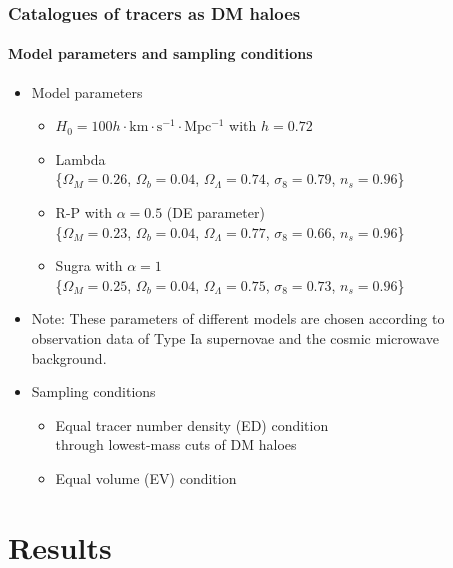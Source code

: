 \documentclass{beamer}
\newtheorem{Narrow down the analysis}{Narrow down the analysis}
\begin{document}
\begin{frame}
	\frametitle{Catalogues of tracers as DM haloes}
	\framesubtitle{Model parameters and sampling conditions}
	\begin{itemize}
	\pause \item Model parameters
		\begin{itemize}
		\pause \item $H_{0}=100h\cdot\mathrm{km\cdot s^{-1}\cdot Mpc^{-1}}$ with $h=0.72$
		\pause \item Lambda\\
		\{$\Omega_{M}=0.26$, $\Omega_{b}=0.04$, $\Omega_{\Lambda}=0.74$, $\sigma_{8}=0.79$, $n_{s}=0.96$\}
		\pause \item R-P with $\alpha=0.5$ (DE parameter)\\
		\{$\Omega_{M}=0.23$, $\Omega_{b}=0.04$, $\Omega_{\Lambda}=0.77$, $\sigma_{8}=0.66$, $n_{s}=0.96$\}
		\pause \item Sugra with $\alpha=1$\\
		\{$\Omega_{M}=0.25$, $\Omega_{b}=0.04$, $\Omega_{\Lambda}=0.75$, $\sigma_{8}=0.73$, $n_{s}=0.96$\}
		\end{itemize}
	\pause \item[\checkmark] Note: These parameters of different models are chosen according to observation data of Type Ia supernovae and the cosmic microwave background.
	\pause \item Sampling conditions
		\begin{itemize}
		\pause \item Equal tracer number density (ED) condition\\
		\pause through lowest-mass cuts of DM haloes
		\pause \item Equal volume (EV) condition
		\end{itemize}
	\end{itemize}
	
\end{frame}
\section{Results}
\end{document}
